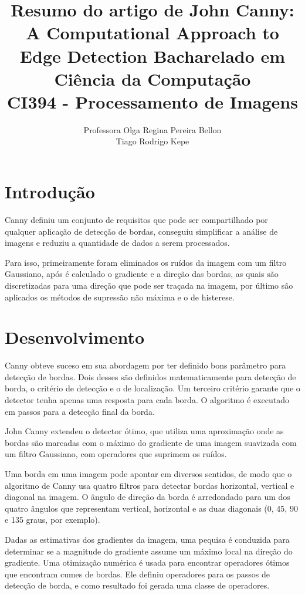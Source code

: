 \documentclass[a4paper,12pt]{article}
\title{Resumo do artigo de John Canny: \\ 
  A Computational Approach to Edge Detection
        \newline 
        \newline 
        Bacharelado em Ciência da Computação \\ 
        CI394 - Processamento de Imagens}
\author{Professora Olga Regina Pereira Bellon\\ Tiago Rodrigo Kepe}
\begin{document}
\maketitle

\section{\textbf{Introdução}}

Canny\cite{CANNY} definiu um conjunto de requisitos que pode ser
compartilhado por qualquer aplicação de detecção de bordas, conseguiu
simplificar a análise de imagens e reduziu a quantidade de dados a serem
processados. 

Para isso, primeiramente foram eliminados os ruídos da imagem
com um filtro Gaussiano, após é calculado o gradiente e a direção das
bordas, as quais são discretizadas para uma direção que pode ser traçada
na imagem, por último são aplicados os métodos de supressão não máxima e o
de histerese.

\section{\textbf{Desenvolvimento}}

Canny\cite{CANNY} obteve suceso em sua abordagem por ter definido bons parâmetro para
detecção de bordas. Dois desses são definidos matematicamente para
detecção de borda, o critério de detecção e o de localização. Um terceiro
critério garante que o detector tenha apenas uma resposta para cada
borda. O algoritmo é executado em passos para a detecção final da borda.

John Canny\cite{CANNY} extendeu o detector ótimo, que utiliza uma aproximação onde
as bordas são marcadas com o máximo do gradiente de uma imagem
suavizada com um filtro Gaussiano, com operadores que suprimem os ruídos.

Uma borda em uma imagem pode apontar em diversos sentidos, de modo que o
algoritmo de Canny usa quatro filtros para detectar bordas horizontal, 
vertical e diagonal na imagem. O ângulo de direção da borda é arredondado
para um dos quatro ângulos que representam vertical, horizontal e as duas
diagonais (0, 45, 90 e 135 graus, por exemplo).

Dadas as estimativas dos gradientes da imagem, uma pequisa é conduzida para
determinar se a magnitude do gradiente assume um máximo local na direção
do gradiente. Uma otimização numérica é usada para encontrar operadores ótimos
que encontram cumes de bordas. Ele definiu operadores para os passos de
detecção de borda, e como resultado foi gerada uma classe de operadores.
\end{document}
